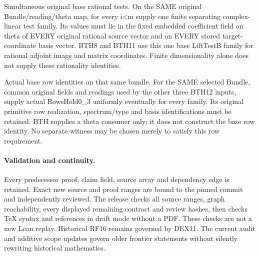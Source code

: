 \begin{description}[style=nextline]
\item[33. BASE\_THETA\_RATIONAL\_TESTS --- C] Simultaneous original base rational tests. On the SAME original Bundle/reading/theta map, for every i<m supply one finite separating complex-linear test family. Its values must lie in the fixed embedded coefficient field on theta of EVERY original rational source vector and on EVERY stored target-coordinate basis vector. BTH8 and BTH11 use this one base LiftTestB family for rational adjoint image and matrix coordinates. Finite dimensionality alone does not supply these rationality identities.

\item[34. SLR\_BASE\_ROWS\_PRODUCER --- C] Actual base row identities on that same bundle. For the SAME selected Bundle, common original fields and readings used by the other three BTH12 inputs, supply actual RowsHold0\_3 uniformly eventually for every family. Its original primitive row realization, spectrum/type and basis identifications must be retained. BTH supplies a theta consumer only; it does not construct the base row identity. No separate witness may be chosen merely to satisfy this row requirement.

\end{description}

\paragraph{Validation and continuity.}
Every predecessor proof, claim field, source array and dependency edge
is retained. Exact new source and proof ranges are bound to the pinned
commit and independently reviewed. The release checks all source ranges,
graph reachability, every displayed remaining contract and review hashes,
then checks TeX syntax and references in draft mode without a PDF.
These checks are not a new Lean replay. Historical RF16 remains governed
by DEX11. The current audit and additive scope updates govern older
frontier statements without silently rewriting historical mathematics.
